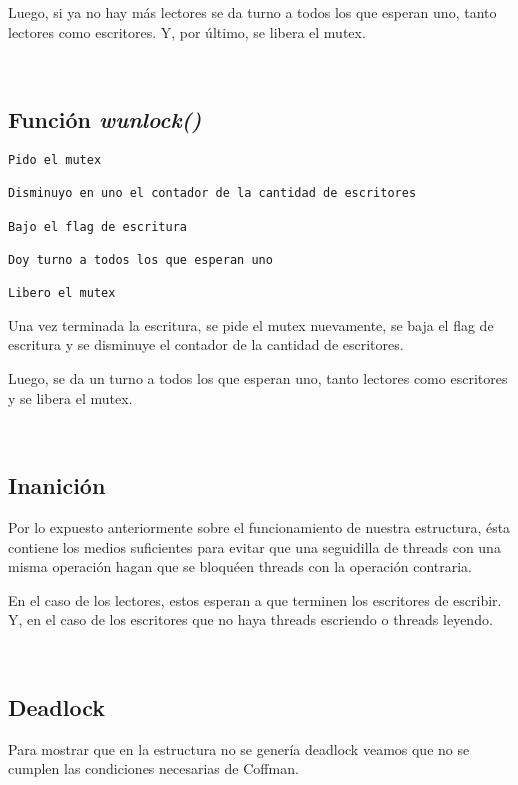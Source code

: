 Luego, si ya no hay más lectores se da turno a todos los que esperan uno, tanto lectores como escritores. Y, por último, se libera el mutex.

~
\subsection{Función \textit{wunlock()}}

\begin{lstlisting}
Pido el mutex

Disminuyo en uno el contador de la cantidad de escritores

Bajo el flag de escritura

Doy turno a todos los que esperan uno

Libero el mutex
\end{lstlisting}

Una vez terminada la escritura, se pide el mutex nuevamente, se baja el flag de escritura y se disminuye el contador de la cantidad de escritores.

Luego, se da un turno a todos los que esperan uno, tanto lectores como escritores y se libera el mutex.


~
\subsection{Inanición}

Por lo expuesto anteriormente sobre el funcionamiento de nuestra estructura, ésta contiene los medios suficientes para evitar que una seguidilla de threads con una misma operación hagan que se bloquéen threads con la operación contraria.

En el caso de los lectores, estos esperan a que terminen los escritores de escribir. Y, en el caso de los escritores que no haya threads escriendo o threads leyendo.

~
\subsection{Deadlock}

Para mostrar que en la estructura no se genería deadlock veamos que no se cumplen las condiciones necesarias de Coffman.

